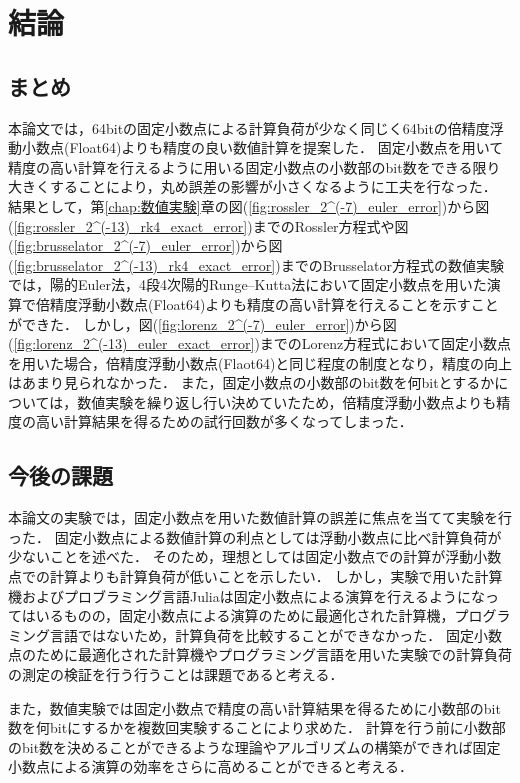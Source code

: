\chapter{結論}
\label{chap:結論}
\section{まとめ}
本論文では，64bitの固定小数点による計算負荷が少なく同じく64bitの倍精度浮動小数点(Float64)よりも精度の良い数値計算を提案した．
固定小数点を用いて精度の高い計算を行えるように用いる固定小数点の小数部のbit数をできる限り大きくすることにより，丸め誤差の影響が小さくなるように工夫を行なった．
結果として，第\ref{chap:数値実験}章の図(\ref{fig:rossler_2^(-7)_euler_error})から図(\ref{fig:rossler_2^(-13)_rk4_exact_error})までのRossler方程式や図(\ref{fig:brusselator_2^(-7)_euler_error})から図(\ref{fig:brusselator_2^(-13)_rk4_exact_error})までのBrusselator方程式の数値実験では，陽的Euler法，4段4次陽的Runge--Kutta法において固定小数点を用いた演算で倍精度浮動小数点(Float64)よりも精度の高い計算を行えることを示すことができた．
しかし，図(\ref{fig:lorenz_2^(-7)_euler_error})から図(\ref{fig:lorenz_2^(-13)_euler_exact_error})までのLorenz方程式において固定小数点を用いた場合，倍精度浮動小数点(Flaot64)と同じ程度の制度となり，精度の向上はあまり見られなかった．
また，固定小数点の小数部のbit数を何bitとするかについては，数値実験を繰り返し行い決めていたため，倍精度浮動小数点よりも精度の高い計算結果を得るための試行回数が多くなってしまった．

\section{今後の課題}
本論文の実験では，固定小数点を用いた数値計算の誤差に焦点を当てて実験を行った．
固定小数点による数値計算の利点としては浮動小数点に比べ計算負荷が少ないことを述べた．
そのため，理想としては固定小数点での計算が浮動小数点での計算よりも計算負荷が低いことを示したい．
しかし，実験で用いた計算機およびプロブラミング言語Juliaは固定小数点による演算を行えるようになってはいるものの，固定小数点による演算のために最適化された計算機，プログラミング言語ではないため，計算負荷を比較することができなかった．
固定小数点のために最適化された計算機やプログラミング言語を用いた実験での計算負荷の測定の検証を行う行うことは課題であると考える．


また，数値実験では固定小数点で精度の高い計算結果を得るために小数部のbit数を何bitにするかを複数回実験することにより求めた．
計算を行う前に小数部のbit数を決めることができるような理論やアルゴリズムの構築ができれば固定小数点による演算の効率をさらに高めることができると考える．